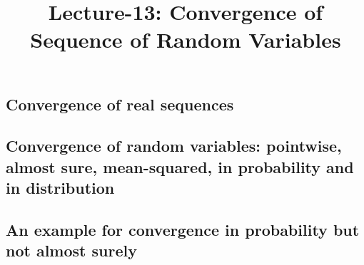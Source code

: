 \documentclass[a4paper,10pt,english]{article}
\title{Lecture-13: Convergence of Sequence of Random Variables}
\author{}
\begin{document}
\maketitle

\subsection{Convergence of real sequences}
\subsection{Convergence of random variables: pointwise, almost sure, mean-squared, in probability and in distribution}
\subsection{An example for convergence in probability but not almost surely}
\end{document}
